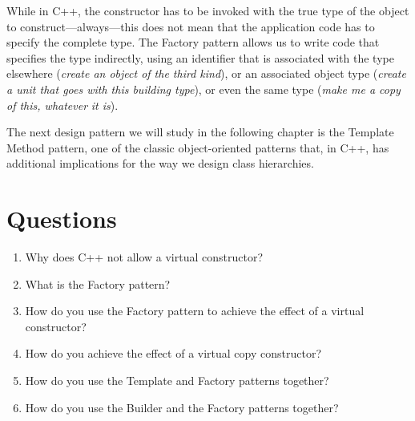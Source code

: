While in C++, the constructor has to be invoked with the true type of the object to construct---always---this does not mean that the application code has to specify the complete type. The Factory pattern allows us to write code that specifies the type indirectly, using an identifier that is associated with the type elsewhere (\emph{create an object of the third kind}), or an associated object type (\emph{create a unit that goes with this building type}), or even the same type (\emph{make me a copy of this, whatever} \emph{it is}).

The next design pattern we will study in the following chapter is the Template Method pattern, one of the classic object-oriented patterns that, in C++, has additional implications for the way we design class hierarchies.

\section{Questions}

\begin{enumerate}
\item
  Why does C++ not allow a virtual constructor?
\item
  What is the Factory pattern?
\item
  How do you use the Factory pattern to achieve the effect of a virtual constructor?
\item
  How do you achieve the effect of a virtual copy constructor?
\item
  How do you use the Template and Factory patterns together?
\item
  How do you use the Builder and the Factory patterns together?
\end{enumerate}

